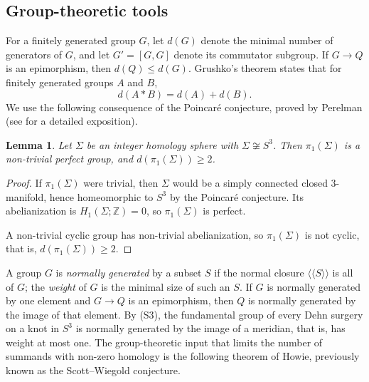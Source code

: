 \documentclass[11pt]{article}
\newcommand{\Z}{\mathbb Z}
\newcommand{\rk}{d}
\newtheorem{lemma}[theorem]{Lemma}
\theoremstyle{definition}
\theoremstyle{remark}
\begin{document}
\subsection{Group-theoretic tools}\label{sec:groups}

For a finitely generated group \(G\), let \(\rk(G)\) denote the minimal
number of generators of \(G\), and let \(G'=[G,G]\) denote its commutator
subgroup. If \(G\to Q\) is an epimorphism, then \(\rk(Q)\leq\rk(G)\).
Grushko's theorem \cite{Grushko1940} states that for finitely generated
groups \(A\) and \(B\),
\begin{equation}\label{eq:grushko}
 \rk(A*B)=\rk(A)+\rk(B).
\end{equation}
We use the following consequence of the Poincar\'e conjecture, proved
by Perelman (see \cite{MorganTian2007} for a detailed exposition).

\begin{lemma}\label{lem:perfect}
Let \(\Sigma\) be an integer homology sphere with \(\Sigma\not\cong S^3\).
Then \(\pi_1(\Sigma)\) is a non-trivial perfect group, and
\(\rk(\pi_1(\Sigma))\geq2\).
\end{lemma}

\begin{proof}
If \(\pi_1(\Sigma)\) were trivial, then \(\Sigma\) would be a simply
connected closed \(3\)-manifold, hence homeomorphic to \(S^3\) by the
Poincar\'e conjecture. Its abelianization is
\(H_1(\Sigma;\Z)=0\), so \(\pi_1(\Sigma)\) is perfect.

A non-trivial
cyclic group has non-trivial abelianization, so \(\pi_1(\Sigma)\) is not
cyclic, that is, \(\rk(\pi_1(\Sigma))\geq2\).
\end{proof}

A group \(G\) is \emph{normally generated} by a subset \(S\) if the
normal closure \(\langle\!\langle S\rangle\!\rangle\) is all of \(G\); the
\emph{weight} of \(G\) is the minimal size of such an \(S\). If \(G\) is
normally generated by one element and \(G\to Q\) is an epimorphism, then
\(Q\) is normally generated by the image of that element. By (S3), the
fundamental group of every Dehn surgery on a knot in \(S^3\) is normally
generated by the image of a meridian, that is, has weight at most one.
The group-theoretic input that limits the number of summands with
non-zero homology is the following theorem of Howie, previously known as
the Scott--Wiegold conjecture.
\end{document}
